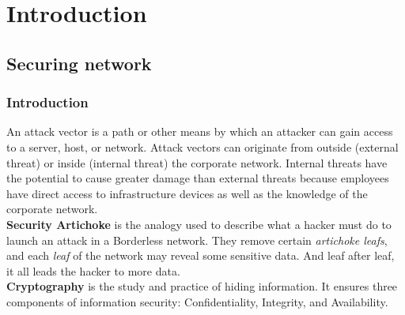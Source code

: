 \chapter{Introduction}

\section{Securing network}

\subsection{Introduction}

An attack vector is a path or other means by which an attacker can gain access to a server, host, or network. Attack vectors can originate from outside (external threat) or inside (internal threat) the corporate network. Internal threats have the potential to cause greater damage than external threats because employees have direct access to infrastructure devices as well as the knowledge of the corporate network.\\

\textbf{Security Artichoke} is the analogy used to describe what a hacker must do to launch an attack in a Borderless network. They  remove certain \emph{artichoke leafs}, and each \emph{leaf} of the network may reveal some sensitive data. And leaf after leaf, it all leads the hacker to more data.\\

\textbf{Cryptography} is the study and practice of hiding information. It ensures three components of information security: Confidentiality, Integrity, and Availability.\\

